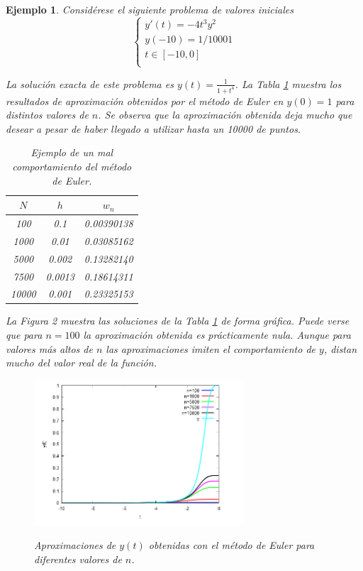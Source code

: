 \documentclass{article}
\theoremstyle{theorem-style}  %
\theoremstyle{definition-style}
\theoremstyle{example-style}
\newtheorem{example}{Ejemplo}[section]
\begin{document}
	\begin{example} \label{ej:motivacion}
		Considérese el siguiente problema de valores iniciales
		\begin{equation*}
			\begin{cases}
			y'(t) = -4 t^3 y^2 \\
			y(-10) = 1/10001 \\
			t \in [-10,0] \\
			\end{cases}
		\end{equation*}

		La solución exacta de este problema es $y(t)=\frac{1}{1+t^4}$. La Tabla \ref{table:euler} muestra los resultados de aproximación obtenidos por el método de Euler en $y(0) = 1$ para distintos valores de $n$. Se observa que la aproximación obtenida deja mucho que desear a pesar de haber llegado a utilizar hasta un 10000 de puntos. 
	
		\begin{table}[H]
			\centering
			\begin{tabular}{|| c | c | c ||}
				\hline
				\hline $N$ &  $h$ & $w_n$ \\
				\hline 100 & 0.1 & 0.00390138 \\
				\hline 1000 & 0.01 & 0.03085162 \\
				\hline 5000 & 0.002 & 0.13282140 \\
				\hline 7500 & 0.0013 & 0.18614311 \\
				\hline 10000 & 0.001 & 0.23325153 \\		
				\hline
				\hline	
			\end{tabular}
			\caption{Ejemplo de un mal comportamiento del método de Euler.}
			\label{table:euler}
		\end{table}
		
		La Figura 2 muestra las soluciones de la Tabla \ref{table:euler} de forma gráfica. Puede verse que para $n=100$ la aproximación obtenida es prácticamente nula. Aunque para valores más altos de $n$ las aproximaciones imiten el comportamiento de $y$, distan mucho del valor real de la función.

		\begin{figure}[H]
			\centering
			\includegraphics[width=0.7\textwidth]{./Images/eulermaxima.png}
			\label{fig:euler}
			\caption{Aproximaciones de $y(t)$ obtenidas con el método de Euler para diferentes valores de $n$.}
		\end{figure}
	\end{example}
	
\end{document}
